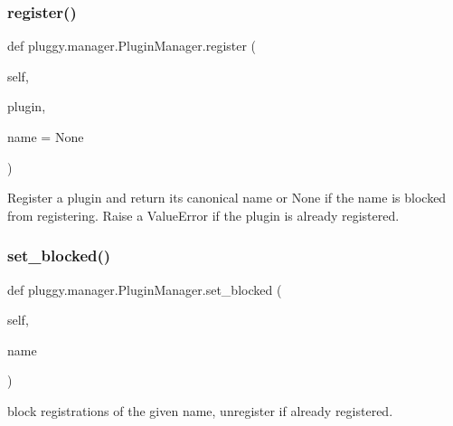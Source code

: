 \subsubsection{\texorpdfstring{register()}{register()}}
{\footnotesize\ttfamily def pluggy.\+manager.\+Plugin\+Manager.\+register (\begin{DoxyParamCaption}\item[{}]{self,  }\item[{}]{plugin,  }\item[{}]{name = {\ttfamily None} }\end{DoxyParamCaption})}

\begin{DoxyVerb}Register a plugin and return its canonical name or None if the name
is blocked from registering.  Raise a ValueError if the plugin is already
registered. \end{DoxyVerb}
 \mbox{\label{classpluggy_1_1manager_1_1_plugin_manager_a3e7953c3c105665df0b5f672858bc635}} 
\subsubsection{\texorpdfstring{set\+\_\+blocked()}{set\_blocked()}}
{\footnotesize\ttfamily def pluggy.\+manager.\+Plugin\+Manager.\+set\+\_\+blocked (\begin{DoxyParamCaption}\item[{}]{self,  }\item[{}]{name }\end{DoxyParamCaption})}

\begin{DoxyVerb}block registrations of the given name, unregister if already registered. \end{DoxyVerb}
 \mbox{\label{classpluggy_1_1manager_1_1_plugin_manager_a100cd4b830d2446bc7893cd35f7270c5}} 
